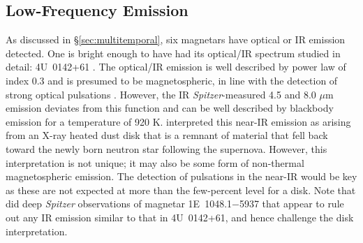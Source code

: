 \subsection{Low-Frequency Emission}
\label{sec:spectra_oir}

As discussed in \S\ref{sec:multitemporal}, six magnetars have
optical or IR emission detected.
One is bright enough to have had its optical/IR spectrum studied
in detail:  4U~0142+61 \citep{wck06}.  
The optical/IR 
emission is well described by power law of index 0.3 and is presumed to be magnetospheric,
in line with the detection of strong optical pulsations \citep{km02,dmh+05}.
However, the IR {\it Spitzer}-measured 4.5 and 8.0 $\mu$m emission deviates from this function
and can be well described by blackbody emission for a temperature of 920 K.  
\citet{wck06} interpreted this near-IR emission as arising from an X-ray heated dust disk that is a remnant
of material that fell back toward the newly born neutron star following the supernova.
However, this interpretation is not unique; 
it may also be some form of non-thermal magnetospheric emission.
The detection of pulsations in the near-IR would be key as 
these are not expected at more than the few-percent level for a disk.  
Note that \citet{wbk+08} did deep {\it Spitzer} observations of magnetar 1E~1048.1$-$5937 that
appear to rule out any IR emission similar to that in 4U~0142+61, and hence challenge
the disk interpretation.




